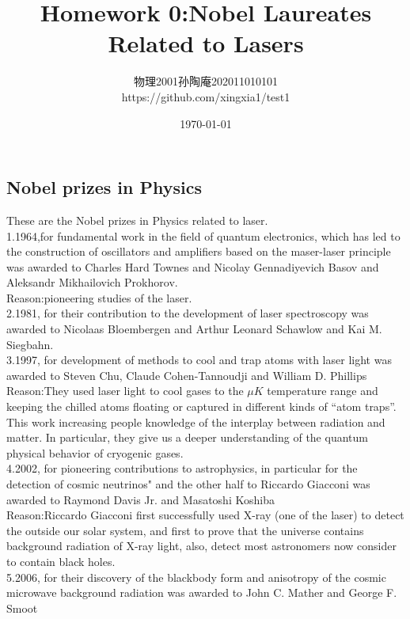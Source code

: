 \documentclass[12pt, a4paper, oneside]{article}
\title{Homework 0:Nobel Laureates Related to Lasers}
\date{\today}
\author{物理2001孙陶庵202011010101\\https://github.com/xingxia1/test1}
\begin{document}
\begin{spacing}{2.0}
\maketitle


\section{Nobel prizes in Physics}


These are the Nobel prizes in Physics related to laser.\\
1.1964,for fundamental work in the field of quantum electronics, which has led to the construction of oscillators and amplifiers based on the maser-laser principle was awarded to Charles Hard Townes and Nicolay Gennadiyevich Basov and Aleksandr Mikhailovich Prokhorov.\\
Reason:pioneering studies of the laser.\\
2.1981, for their contribution to the development of laser spectroscopy\cite{RN12} was awarded to Nicolaas Bloembergen and Arthur Leonard Schawlow and Kai M. Siegbahn.\\
3.1997, for development of methods to cool and trap atoms with laser light\cite{RN11} was awarded to Steven Chu, Claude Cohen-Tannoudji and William D. Phillips\\
Reason:They used laser light to cool gases to the $\mu K$ temperature range and keeping the chilled atoms floating or captured in different kinds of “atom traps”.\\
This work increasing people knowledge of the interplay between radiation and matter. In particular, they give us a deeper understanding of the quantum physical behavior of cryogenic gases.\\
4.2002, for pioneering contributions to astrophysics, in particular for the detection of cosmic neutrinos" and the other half to Riccardo Giacconi\cite{RN09} was awarded to Raymond Davis Jr. and Masatoshi Koshiba\\
Reason:Riccardo Giacconi first successfully used X-ray (one of the laser) to detect the outside our solar system, and first to prove that the universe contains background radiation of X-ray light, also, detect most astronomers now consider to contain black holes. \\
5.2006, for their discovery of the blackbody form and anisotropy of the cosmic microwave background radiation\cite{RN06} was awarded to John C. Mather and George F. Smoot\\

\end{spacing}
\end{document}
